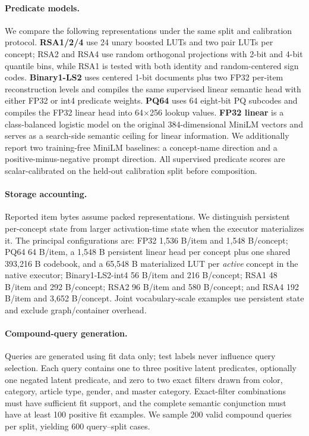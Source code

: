 \paragraph{Predicate models.} We compare the following representations under the same split and calibration protocol. \textbf{RSA1/2/4} use 24 unary boosted LUTs and two pair LUTs per concept; RSA2 and RSA4 use random orthogonal projections with 2-bit and 4-bit quantile bins, while RSA1 is tested with both identity and random-centered sign codes. \textbf{Binary1-LS2} uses centered 1-bit documents plus two FP32 per-item reconstruction levels and compiles the same supervised linear semantic head with either FP32 or int4 predicate weights. \textbf{PQ64} uses 64 eight-bit PQ subcodes and compiles the FP32 linear head into 64$\times$256 lookup values. \textbf{FP32 linear} is a class-balanced logistic model on the original 384-dimensional MiniLM vectors and serves as a search-side semantic ceiling for linear information. We additionally report two training-free MiniLM baselines: a concept-name direction and a positive-minus-negative prompt direction. All supervised predicate scores are scalar-calibrated on the held-out calibration split before composition.

\paragraph{Storage accounting.} Reported item bytes assume packed representations. We distinguish persistent per-concept state from larger activation-time state when the executor materializes it. The principal configurations are: FP32 1,536 B/item and 1,548 B/concept; PQ64 64 B/item, a 1,548 B persistent linear head per concept plus one shared 393,216 B codebook, and a 65,548 B materialized LUT per \emph{active} concept in the native executor; Binary1-LS2-int4 56 B/item and 216 B/concept; RSA1 48 B/item and 292 B/concept; RSA2 96 B/item and 580 B/concept; and RSA4 192 B/item and 3,652 B/concept. Joint vocabulary-scale examples use persistent state and exclude graph/container overhead.

\paragraph{Compound-query generation.} Queries are generated using fit data only; test labels never influence query selection. Each query contains one to three positive latent predicates, optionally one negated latent predicate, and zero to two exact filters drawn from color, category, article type, gender, and master category. Exact-filter combinations must have sufficient fit support, and the complete semantic conjunction must have at least 100 positive fit examples. We sample 200 valid compound queries per split, yielding 600 query--split cases.

